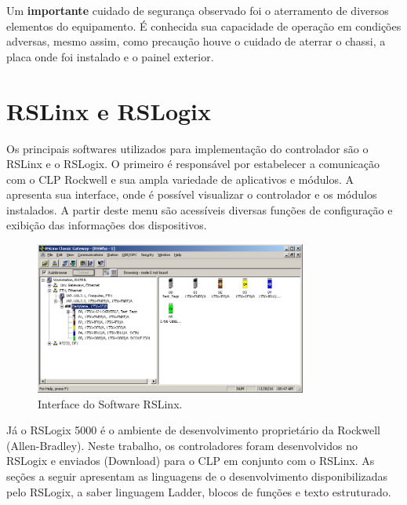 \begin{table}[!ht]
	\caption{IPs dos dispositivos}
	\label{tabIPs}
	\small
	\centering
\end{table}

Um \textbf{importante} cuidado de segurança observado foi o aterramento de diversos elementos do equipamento. É conhecida sua capacidade de operação em condições adversas, mesmo assim, como precaução houve o cuidado de aterrar o chassi, a placa onde foi instalado e o painel exterior.

\section{RSLinx e RSLogix}
Os principais softwares utilizados para implementação do controlador são o RSLinx e o RSLogix. O primeiro é responsável por estabelecer a comunicação com o CLP Rockwell e sua ampla variedade de aplicativos e módulos. A  apresenta sua interface, onde é possível visualizar o controlador e os módulos instalados. A partir deste menu são acessíveis diversas funções de configuração e exibição das informações dos dispositivos.

\begin{figure}[H]
	\centering
	\includegraphics[height=5cm,keepaspectratio]{img/RSLinx.png}
	\caption{Interface do Software RSLinx.}
	\label{imgRSLinx}
\end{figure}

Já o RSLogix 5000 é o ambiente de desenvolvimento proprietário da Rockwell (Allen-Bradley). Neste trabalho, os controladores foram desenvolvidos no RSLogix e enviados (Download) para o CLP em conjunto com o RSLinx. As seções a seguir apresentam as linguagens de o desenvolvimento disponibilizadas pelo RSLogix, a saber linguagem Ladder, blocos de funções e texto estruturado.

